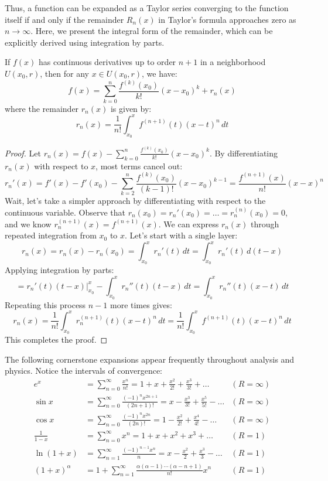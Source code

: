 Thus, a function can be expanded as a Taylor series converging to the function itself if and only if the remainder $R_n(x)$ in Taylor's formula approaches zero as $n \to \infty$. Here, we present the integral form of the remainder, which can be explicitly derived using integration by parts.

\begin{theorem}
If $f(x)$ has continuous derivatives up to order $n+1$ in a neighborhood $U(x_0, r)$, then for any $x \in U(x_0, r)$, we have:
\[ f(x) = \sum_{k=0}^{n} \frac{f^{(k)}(x_0)}{k!} (x-x_0)^k + r_n(x) \]
where the remainder $r_n(x)$ is given by:
\[ r_n(x) = \frac{1}{n!} \int_{x_0}^{x} f^{(n+1)}(t) (x-t)^n \, dt \]
\end{theorem}
\begin{proof}
Let $r_n(x) = f(x) - \sum_{k=0}^{n} \frac{f^{(k)}(x_0)}{k!} (x-x_0)^k$. By differentiating $r_n(x)$ with respect to $x$, most terms cancel out:
\[ r_n'(x) = f'(x) - f'(x_0) - \sum_{k=2}^{n} \frac{f^{(k)}(x_0)}{(k-1)!} (x-x_0)^{k-1} = \frac{f^{(n+1)}(x)}{n!} (x-x)^{n} \]
Wait, let's take a simpler approach by differentiating with respect to the continuous variable. Observe that $r_n(x_0) = r_n'(x_0) = \dots = r_n^{(n)}(x_0) = 0$, and we know $r_n^{(n+1)}(x) = f^{(n+1)}(x)$.
We can express $r_n(x)$ through repeated integration from $x_0$ to $x$. Let's start with a single layer:
\[ r_n(x) = r_n(x) - r_n(x_0) = \int_{x_0}^{x} r_n'(t) \, dt = \int_{x_0}^{x} r_n'(t) \, d(t-x) \]
Applying integration by parts:
\[ = r_n'(t)(t-x) \Big|_{x_0}^{x} - \int_{x_0}^{x} r_n''(t)(t-x) \, dt = \int_{x_0}^{x} r_n''(t)(x-t) \, dt \]
Repeating this process $n-1$ more times gives:
\[ r_n(x) = \frac{1}{n!} \int_{x_0}^{x} r_n^{(n+1)}(t) (x-t)^n \, dt = \frac{1}{n!} \int_{x_0}^{x} f^{(n+1)}(t) (x-t)^n \, dt \]
This completes the proof.
\end{proof}

\newpage

\begin{example}
The following cornerstone expansions appear frequently throughout analysis and physics. Notice the intervals of convergence:
\begin{align*}
    e^x &= \sum_{n=0}^{\infty} \frac{x^n}{n!} = 1 + x + \frac{x^2}{2!} + \frac{x^3}{3!} + \dots & (R = \infty) \\
    \sin x &= \sum_{n=0}^{\infty} \frac{(-1)^n x^{2n+1}}{(2n+1)!} = x - \frac{x^3}{3!} + \frac{x^5}{5!} - \dots & (R = \infty) \\
    \cos x &= \sum_{n=0}^{\infty} \frac{(-1)^n x^{2n}}{(2n)!} = 1 - \frac{x^2}{2!} + \frac{x^4}{4!} - \dots & (R = \infty) \\
    \frac{1}{1-x} &= \sum_{n=0}^{\infty} x^n = 1 + x + x^2 + x^3 + \dots & (R = 1) \\
    \ln(1+x) &= \sum_{n=1}^{\infty} \frac{(-1)^{n-1} x^n}{n} = x - \frac{x^2}{2} + \frac{x^3}{3} - \dots & (R = 1) \\
    (1+x)^\alpha &= 1 + \sum_{n=1}^{\infty} \frac{\alpha(\alpha-1)\cdots(\alpha-n+1)}{n!} x^n & (R = 1)
\end{align*}
\end{example}

